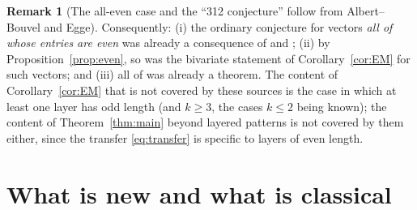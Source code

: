 \documentclass[11pt]{amsart}
\theoremstyle{definition}
\newtheorem{remark}[theorem]{Remark}
\begin{document}
\begin{remark}[The all-even case and the ``312 conjecture'' follow from Albert--Bouvel and Egge]
Consequently: (i) the ordinary conjecture \cite[Conjecture 6.9]{Egge2004} for vectors \emph{all of whose entries are even} was already a consequence of \cite{AlbertBouvel2015} and \cite{Egge2007}; (ii) by Proposition~\ref{prop:even}, so was the bivariate statement of Corollary~\ref{cor:EM} for such vectors; and (iii) all of \cite[Conjecture 3.7]{Egge2007} was already a theorem. The content of Corollary~\ref{cor:EM} that is not covered by these sources is the case in which at least one layer has odd length (and $k\ge3$, the cases $k\le2$ being known); the content of Theorem~\ref{thm:main} beyond layered patterns is not covered by them either, since the transfer \eqref{eq:transfer} is specific to layers of even length.
\end{remark}

\section{What is new and what is classical}\label{sec:credits}
\end{document}
